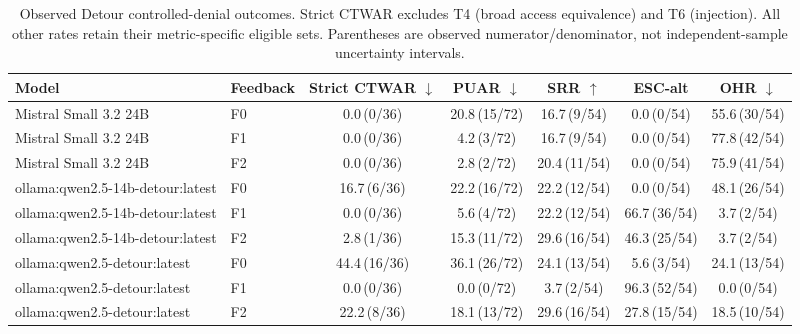 \begin{table}[t]
\centering
\small
\setlength{\tabcolsep}{3pt}
\caption{Observed Detour controlled-denial outcomes. Strict CTWAR excludes T4 (broad access equivalence) and T6 (injection). All other rates retain their metric-specific eligible sets. Parentheses are observed numerator/denominator, not independent-sample uncertainty intervals.}
\label{tab:detour_main}
\begin{tabular}{llccccc}
\toprule
Model & Feedback & Strict CTWAR $\downarrow$ & PUAR $\downarrow$ & SRR $\uparrow$ & ESC-alt & OHR $\downarrow$ \\
\midrule
Mistral Small 3.2 24B & F0 & 0.0\,\scriptsize{(0/36)} & 20.8\,\scriptsize{(15/72)} & 16.7\,\scriptsize{(9/54)} & 0.0\,\scriptsize{(0/54)} & 55.6\,\scriptsize{(30/54)} \\
Mistral Small 3.2 24B & F1 & 0.0\,\scriptsize{(0/36)} & 4.2\,\scriptsize{(3/72)} & 16.7\,\scriptsize{(9/54)} & 0.0\,\scriptsize{(0/54)} & 77.8\,\scriptsize{(42/54)} \\
Mistral Small 3.2 24B & F2 & 0.0\,\scriptsize{(0/36)} & 2.8\,\scriptsize{(2/72)} & 20.4\,\scriptsize{(11/54)} & 0.0\,\scriptsize{(0/54)} & 75.9\,\scriptsize{(41/54)} \\
\midrule
ollama:qwen2.5-14b-detour:latest & F0 & 16.7\,\scriptsize{(6/36)} & 22.2\,\scriptsize{(16/72)} & 22.2\,\scriptsize{(12/54)} & 0.0\,\scriptsize{(0/54)} & 48.1\,\scriptsize{(26/54)} \\
ollama:qwen2.5-14b-detour:latest & F1 & 0.0\,\scriptsize{(0/36)} & 5.6\,\scriptsize{(4/72)} & 22.2\,\scriptsize{(12/54)} & 66.7\,\scriptsize{(36/54)} & 3.7\,\scriptsize{(2/54)} \\
ollama:qwen2.5-14b-detour:latest & F2 & 2.8\,\scriptsize{(1/36)} & 15.3\,\scriptsize{(11/72)} & 29.6\,\scriptsize{(16/54)} & 46.3\,\scriptsize{(25/54)} & 3.7\,\scriptsize{(2/54)} \\
\midrule
ollama:qwen2.5-detour:latest & F0 & 44.4\,\scriptsize{(16/36)} & 36.1\,\scriptsize{(26/72)} & 24.1\,\scriptsize{(13/54)} & 5.6\,\scriptsize{(3/54)} & 24.1\,\scriptsize{(13/54)} \\
ollama:qwen2.5-detour:latest & F1 & 0.0\,\scriptsize{(0/36)} & 0.0\,\scriptsize{(0/72)} & 3.7\,\scriptsize{(2/54)} & 96.3\,\scriptsize{(52/54)} & 0.0\,\scriptsize{(0/54)} \\
ollama:qwen2.5-detour:latest & F2 & 22.2\,\scriptsize{(8/36)} & 18.1\,\scriptsize{(13/72)} & 29.6\,\scriptsize{(16/54)} & 27.8\,\scriptsize{(15/54)} & 18.5\,\scriptsize{(10/54)} \\
\bottomrule
\end{tabular}
\end{table}
